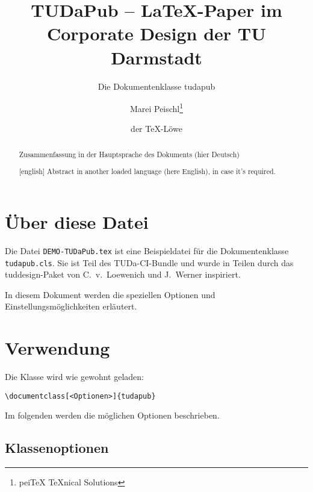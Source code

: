 \documentclass[
	german,%
	accentcolor=9c,%
]{tudapub}
\title{TUDaPub -- \LaTeX-Paper im Corporate Design der TU Darmstadt}
\subtitle{Die Dokumentenklasse tudapub}
\author{Marei Peischl\thanks{pei\TeX{} \TeX{}nical Solutions}\and der \TeX-Löwe}
\newcommand*{\file}[1]{\texttt{#1}}
\begin{document}
\maketitle

\begin{abstract}
	Zusammenfassung in der Hauptsprache des Dokuments (hier Deutsch)
\end{abstract}

\begin{abstract}[english]
	Abstract in another loaded language (here English), in case it's required.
\end{abstract}

\tableofcontents


\section{Über diese Datei}

Die Datei \file{DEMO-TUDaPub.tex} ist eine Beispieldatei für die Dokumentenklasse \file{tudapub.cls}.
Sie ist Teil des TUDa-CI-Bundle und wurde in Teilen durch das tuddesign-Paket von C.~v.~Loewenich und J.~Werner inspiriert.


In diesem Dokument werden die speziellen Optionen und Einstellungsmöglichkeiten erläutert.

\section{Verwendung}
Die Klasse wird wie gewohnt geladen:
\begin{verbatim}
\documentclass[<Optionen>]{tudapub}
\end{verbatim}
Im folgenden werden die möglichen Optionen beschrieben.

\subsection{Klassenoptionen}
\end{document}
